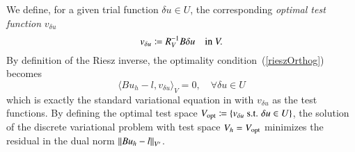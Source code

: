 We define, for a given trial function $\delta u \in U$, the corresponding {\em optimal test function} $v_{\delta u}$
\begin{equation}
\eqnlab{optv}
v_{\delta u} \coloneqq R_V^{-1}B\delta u \quad  \text{in } V.
\end{equation} 
By definition of the Riesz inverse, the optimality condition~(\ref{rieszOrthog}) becomes
\[
 \langle Bu_h-l, v_{\delta u}\rangle_V = 0, \quad \forall \delta u \in U
\]
which is exactly the standard variational equation in  with $v_{\delta u}$ as the test functions. By defining the optimal test space $V_{\rm opt} \coloneqq \{v_{\delta u} \text{ s.t. } \delta u\in U\}$, the solution of the discrete variational problem  with test space $V_h = V_{\rm opt}$ minimizes the residual in the dual norm $\nor{Bu_h-l}_{V'}$. 

